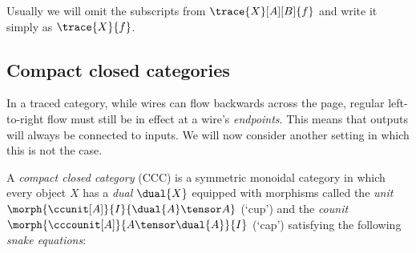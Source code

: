 Usually we will omit the subscripts from \(\trace{X}[A][B]{f}\) and write it
simply as \(\trace{X}{f}\).



\subsection{Compact closed categories}

In a traced category, while wires can flow backwards across the page, regular
left-to-right flow must still be in effect at a wire's \emph{endpoints}.
This means that outputs will always be connected to inputs.
We will now consider another setting in which this is not the case.

\begin{definition}
    A \emph{compact closed category} (CCC) is a symmetric monoidal category in
    which every object \(X\) has a \emph{dual} \(\dual{X}\) equipped with
    morphisms called the \emph{unit} \(
        \morph{\ccunit[A]}{I}{\dual{A} \tensor A}
    \) (`cup') and the \emph{counit} \(
        \morph{\cccounit[A]}{A \tensor \dual{A}}{I}
    \) (`cap') satisfying the following \emph{snake equations}:
\end{definition}